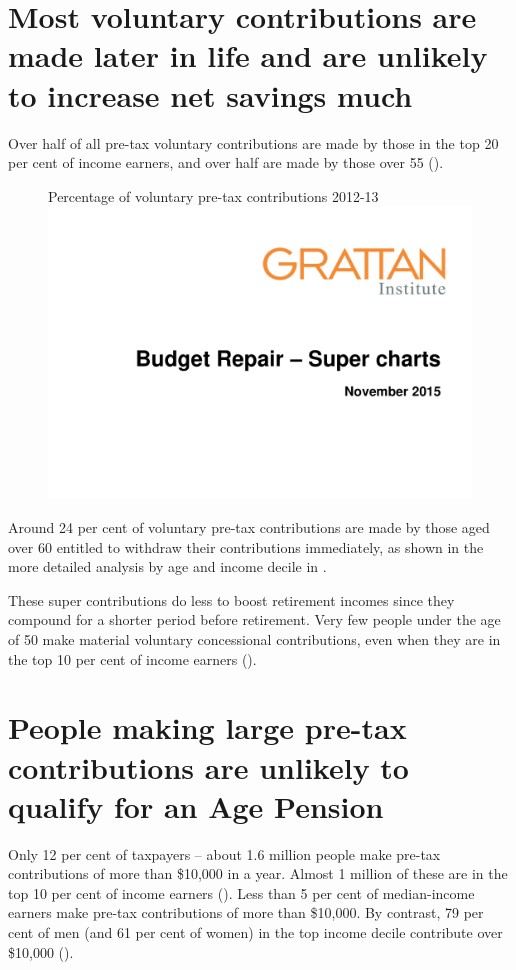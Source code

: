 \section{Most voluntary contributions are made later in life and are unlikely to increase net savings much\label{sec:SUPER-4-3}}
Over half of all pre-tax voluntary contributions are made by those in the top 20 per cent of income earners, and over half are made by those over 55 (). 
\begin{figure}
%
{Percentage of voluntary pre-tax contributions 2012-13}\label{fig:SUPER-4-5}
\includegraphics[width=\columnwidth,page=23]{super-atlas/PPTX.pdf}

\end{figure}

Around 24 per cent of voluntary pre-tax contributions are made by those aged over 60 entitled to withdraw their contributions immediately, as shown in the more detailed analysis by age and income decile in .

These super contributions do less to boost retirement incomes since they compound for a shorter period before retirement. Very few people under the age of 50 make material voluntary concessional contributions, even when they are in the top 10 per cent of income earners ().

\section{People making large pre-tax contributions are unlikely to qualify for an Age Pension}
Only 12 per cent of taxpayers – about 1.6 million people make pre-tax contributions of more than \$10,000 in a year. Almost 1 million of these are in the top 10 per cent of income earners (). Less than 5 per cent of median-income earners make pre-tax contributions of more than \$10,000. By contrast, 79 per cent of men (and 61 per cent of women) in the top income decile contribute over \$10,000 (). 

